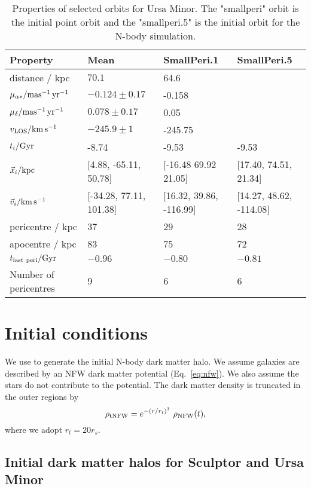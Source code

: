 \begin{table*}[t]
\centering
\caption[Ursa Minor Selected Orbits]{Properties of selected orbits for Ursa Minor. The "smallperi" orbit is the initial point orbit and the "smallperi.5" is the initial orbit for the N-body simulation. }
\label{tbl:umi_orbits}
\begin{tabular}{llll}
\toprule
Property & Mean & SmallPeri.1 & SmallPeri.5\\
\midrule
distance / kpc & $70.1$ & 64.6 & \\
$\mu_{\alpha*} / {\rm mas^{-1}\,yr^{-1}}$ & $-0.124 \pm 0.17$ & -0.158 & \\
$\mu_{\delta} / {\rm mas^{-1}\,yr^{-1}}$ & $0.078\pm0.17$ & 0.05 & \\
$v_{\rm LOS} / {\rm km\,s^{-1}}$ & $-245.9\pm 1$ & -245.75 & \\
$t_i / {\rm Gyr}$ & -8.74 & -9.53 & -9.53\\
$\vec{x}_{i} / {\rm kpc}$ & [4.88, -65.11, 50.78] & [-16.48 69.92 21.05] & [17.40, 74.51, 21.34]\\
$\vec{v}_i / {\rm km\,s^{-1}}$ & [-34.28, 77.11, 101.38] & [16.32, 39.86, -116.99] & [14.27, 48.62, -114.08]\\
pericentre / kpc & 37 & 29 & 28\\
apocentre / kpc & 83 & 75 & 72\\
$t_{\rm last\ peri} / \Gyr$ & $-0.96$ & $-0.80$ & $-0.81$\\
Number of pericentres & 9 & 6 & 6\\
\bottomrule
\end{tabular}
\end{table*}

\section{Initial conditions}\label{initial-conditions}

We use \agama{} \citep{agama} to generate the initial N-body dark matter
halo. We assume galaxies are described by an NFW dark matter potential
(Eq.~\ref{eq:nfw}). We also assume the stars do not contribute to the
potential. The dark matter density is truncated in the outer regions by
\begin{equation}{
\rho_{\rm tNFW} = e^{-(r/r_t)^3}\ \rho_{\rm NFW}(t),
}\end{equation} where we adopt \(r_t = 20 r_s\).

\subsection{Initial dark matter halos for Sculptor and Ursa
Minor}\label{initial-dark-matter-halos-for-sculptor-and-ursa-minor}

